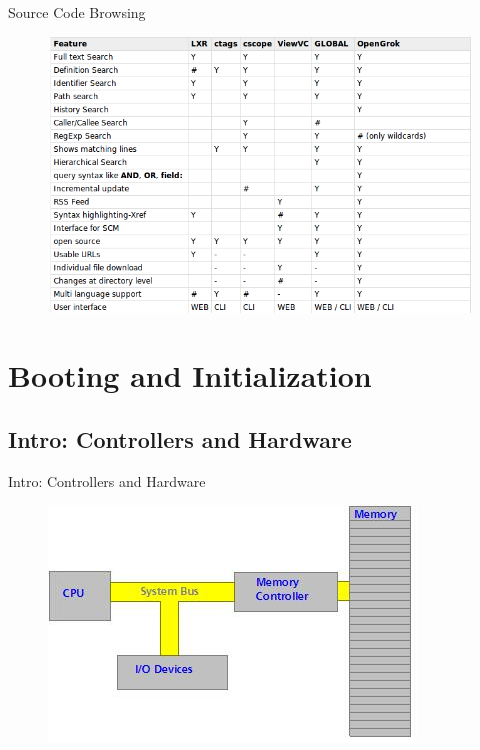 \documentclass{workshop}
\begin{document}
\begin{frame}{Source Code Browsing}
\begin{figure}
  \includegraphics[scale=0.35]{img/source.png}
\end{figure}
\end{frame}

\section{Booting and Initialization}
\subsection{Intro: Controllers and Hardware}
\begin{frame}{Intro: Controllers and Hardware}
     \begin{figure}
         \includegraphics[scale=0.9]{img/bus.jpg}
      \end{figure}
\end{frame}
\end{document}
